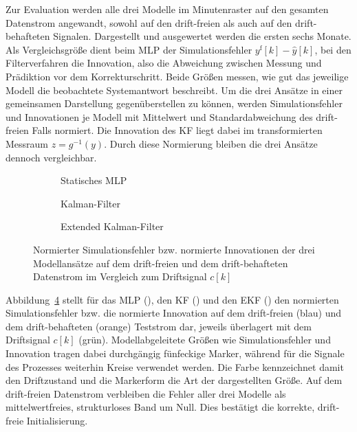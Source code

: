%
Zur Evaluation werden alle drei Modelle im Minutenraster auf den gesamten Datenstrom angewandt, sowohl auf den drift-freien als auch auf den drift-behafteten Signalen. Dargestellt und ausgewertet werden die ersten sechs Monate. Als Vergleichsgröße dient beim \ac{MLP} der Simulationsfehler $y^{\mathrm{f}}[k] - \hat{y}[k]$, bei den Filterverfahren die Innovation, also die Abweichung zwischen Messung und Prädiktion vor dem Korrekturschritt. Beide Größen messen, wie gut das jeweilige Modell die beobachtete Systemantwort beschreibt. Um die drei Ansätze in einer gemeinsamen Darstellung gegenüberstellen zu können, werden Simulationsfehler und Innovationen je Modell mit Mittelwert und Standardabweichung des drift-freien Falls normiert. Die Innovation des \ac{KF} liegt dabei im transformierten Messraum $z = g^{-1}(y)$. Durch diese Normierung bleiben die drei Ansätze dennoch vergleichbar. \par
%
\begin{figure}[tbp]
    \centering
    \begin{subfigure}[t]{\textwidth}
        \centering
        
        \caption{Statisches \ac{MLP}}
        \label{fig:synthetic_data_model_error_mlp}
    \end{subfigure}

    \begin{subfigure}[t]{\textwidth}
        \centering
        
        \caption{Kalman-Filter}
        \label{fig:synthetic_data_model_error_kf}
    \end{subfigure}

    \begin{subfigure}[t]{\textwidth}
        \centering
        
        \caption{Extended Kalman-Filter}
        \label{fig:synthetic_data_model_error_ekf}
    \end{subfigure}
    \caption{Normierter Simulationsfehler bzw. normierte Innovationen der drei Modellansätze auf dem drift-freien und dem drift-behafteten Datenstrom im Vergleich zum Driftsignal $c[k]$}
    \label{fig:synthetic_data_model_error_cd}
\end{figure}
%
Abbildung~\ref{fig:synthetic_data_model_error_cd} stellt für das \ac{MLP} (), den \ac{KF} () und den \ac{EKF} () den normierten Simulationsfehler bzw. die normierte Innovation auf dem drift-freien (blau) und dem drift-behafteten (orange) Teststrom dar, jeweils überlagert mit dem Driftsignal $c[k]$ (grün). Modellabgeleitete Größen wie Simulationsfehler und Innovation tragen dabei durchgängig fünfeckige Marker, während für die Signale des Prozesses weiterhin Kreise verwendet werden. Die Farbe kennzeichnet damit den Driftzustand und die Markerform die Art der dargestellten Größe. Auf dem drift-freien Datenstrom verbleiben die Fehler aller drei Modelle als mittelwertfreies, strukturloses Band um Null. Dies bestätigt die korrekte, drift-freie Initialisierung.
